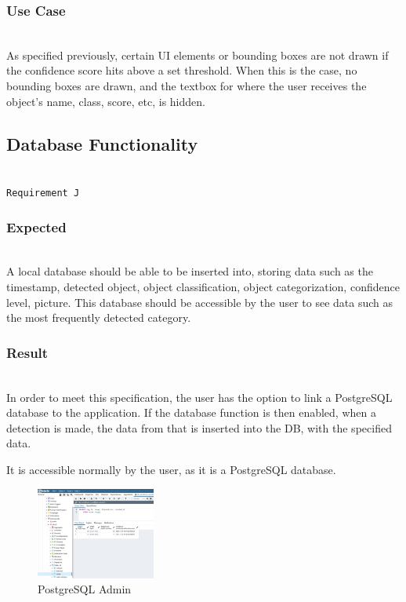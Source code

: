 \documentclass[conference]{IEEEtran}
\begin{document}
\subsubsection{Use Case}~\\
As specified previously, certain UI elements or bounding boxes are not drawn if the confidence score hits above a set threshold. When this is the case, no bounding boxes are drawn, and the textbox for where the user receives the object's name, class, score, etc, is hidden.~\\

\subsection{Database Functionality}~\\
\texttt{Requirement J}~\\
\subsubsection{Expected}~\\
A local database should be able to be inserted into, storing data such as the timestamp, detected object, object classification, object categorization, confidence level, picture. This database should be accessible by the user to see data such as the most frequently detected category.~\\

\subsubsection{Result}~\\
In order to meet this specification, the user has the option to link a PostgreSQL database to the application. If the database function is then enabled, when a detection is made, the data from that is inserted into the DB, with the specified data.

It is accessible normally by the user, as it is a PostgreSQL database.

\begin{figure}[!h]
    \centering
    \includegraphics[width=0.35\textwidth]{images/code_diagrams/pgadmin_db.eps}
    \caption{PostgreSQL Admin}
\end{figure}~\\
\end{document}
